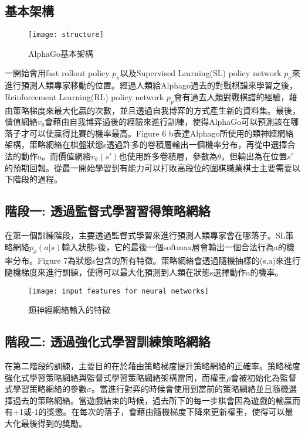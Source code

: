 \documentclass[a4paper,12pt]{article}
\begin{document}
\subsection{基本架構}
\begin{figure*}[htb]
\texttt{[image: structure]}
\caption{AlphaGo基本架構}
\end{figure*}
\quad 一開始會用fast rollout policy $p_{\pi}$以及Supervised Learning(SL) policy network $p_{\sigma}$來進行預測人類專家移動的位置。經過人類給Alphago過去的對戰棋譜來學習之後，Reinforcement Learning(RL) policy network $p_{p}$會有過去人類對戰棋譜的經驗，藉由策略梯度來最大化贏的次數，並且透過自我博弈的方式產生新的資料集。最後，價值網絡$v_{\theta}$會藉由自我博弈過後的經驗來進行訓練，使得AlphaGo可以預測該在哪落子才可以使贏得比賽的機率最高。Figure 6 b表達Alphago所使用的類神經網絡架構，策略網絡在棋盤狀態s透過許多的卷積層輸出一個機率分布，再從中選擇合法的動作a。而價值網絡$v_{\theta}(s')$也使用許多卷積層，參數為$\theta$。但輸出為在位置$s'$的預期回報。從最一開始學習到有能力可以打敗高段位的圍棋職業棋士主要需要以下階段的過程。
\subsection{階段一: 透過監督式學習習得策略網絡}
\qquad 在第一個訓練階段，主要透過監督式學習來進行預測人類專家會在哪落子。SL策略網絡$p_{\rho}(a|s)$輸入狀態s後，它的最後一個softmax層會輸出一個合法行為a的機率分布。Figure 7為狀態s包含的所有特徵。策略網絡會透過隨機抽樣的(s,a)來進行隨機梯度來進行訓練，使得可以最大化預測到人類在狀態s選擇動作a的機率。

\begin{figure*}[htb]
\texttt{[image: input features for neural networks]}
\caption{類神經網絡輸入的特徵}
\end{figure*}

\subsection{階段二: 透過強化式學習訓練策略網絡}
\qquad 在第二階段的訓練，主要目的在於藉由策略梯度提升策略網絡的正確率。策略梯度強化式學習策略網絡與監督式學習策略網絡架構雷同，而權重$\rho$會被初始化為監督式學習策略網絡的參數$\sigma$。當進行對弈的時候會使用到當前的策略網絡並且隨機選擇過去的策略網絡。當遊戲結束的時候，過去所下的每一步棋會因為遊戲的輸贏而有+1或-1的獎懲。在每次的落子，會藉由隨機梯度下降來更新權重，使得可以最大化最後得到的獎勵。
\end{document}
